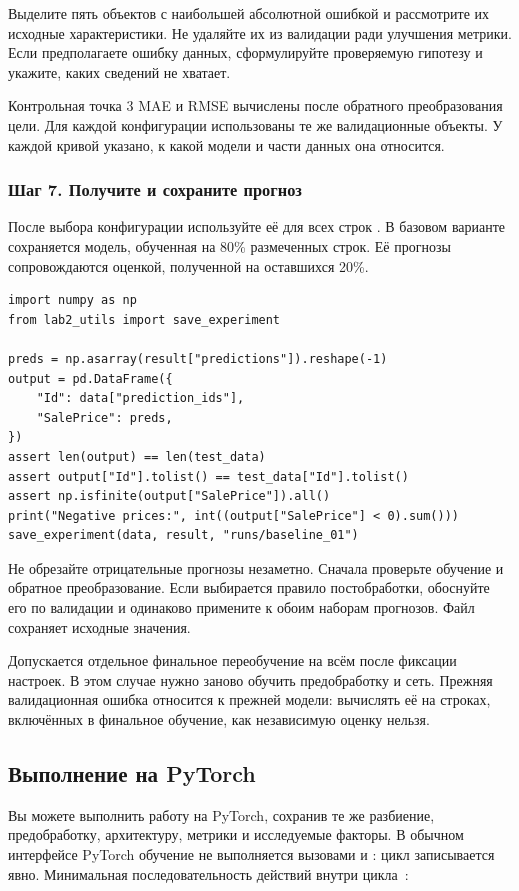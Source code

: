 Выделите пять объектов с наибольшей абсолютной ошибкой и рассмотрите
их исходные характеристики. Не удаляйте их из валидации ради улучшения
метрики. Если предполагаете ошибку данных, сформулируйте проверяемую
гипотезу и укажите, каких сведений не хватает.

\begin{keybox}{Контрольная точка 3}
MAE и RMSE вычислены после обратного преобразования цели. Для каждой
конфигурации использованы те же валидационные объекты. У каждой кривой
указано, к какой модели и части данных она относится.
\end{keybox}

\subsubsection*{Шаг 7. Получите и сохраните прогноз}
После выбора конфигурации используйте её для всех строк
. В базовом варианте сохраняется модель, обученная на
80\% размеченных строк. Её прогнозы сопровождаются оценкой, полученной
на оставшихся 20\%.

\begin{lstlisting}
import numpy as np
from lab2_utils import save_experiment

preds = np.asarray(result["predictions"]).reshape(-1)
output = pd.DataFrame({
    "Id": data["prediction_ids"],
    "SalePrice": preds,
})
assert len(output) == len(test_data)
assert output["Id"].tolist() == test_data["Id"].tolist()
assert np.isfinite(output["SalePrice"]).all()
print("Negative prices:", int((output["SalePrice"] < 0).sum()))
save_experiment(data, result, "runs/baseline_01")
\end{lstlisting}

Не обрезайте отрицательные прогнозы незаметно. Сначала проверьте обучение
и обратное преобразование. Если выбирается правило постобработки,
обоснуйте его по валидации и одинаково примените к обоим наборам
прогнозов. Файл  сохраняет исходные значения.

Допускается отдельное финальное переобучение на всём 
после фиксации настроек. В этом случае нужно заново обучить
предобработку и сеть. Прежняя валидационная ошибка относится к прежней
модели: вычислять её на строках, включённых в финальное обучение,
как независимую оценку нельзя.

\subsection{Выполнение на PyTorch}
Вы можете выполнить работу на PyTorch, сохранив те же разбиение,
предобработку, архитектуру, метрики и исследуемые факторы.
В обычном интерфейсе PyTorch обучение не выполняется вызовами
 и : цикл записывается явно.
Минимальная последовательность действий внутри цикла~\cite{pytorch}:

